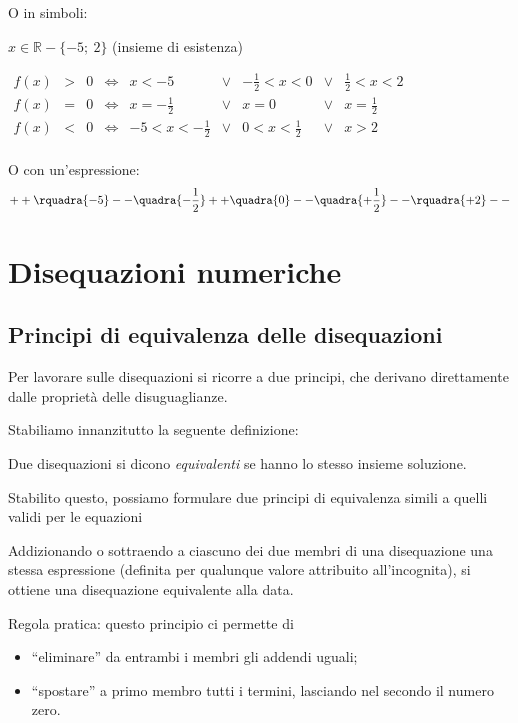 O in simboli:

\(x \in \mathbb{R} - \{ -5;~2 \}\) (insieme di esistenza)

\(\begin{array}{cccccccccc}
f(x) & > & 0 & \Leftrightarrow &
 x < -5 & \lor & -\frac{1}{2} < x < 0 & \lor & \frac{1}{2} < x < 2 \\
f(x) & = & 0 & \Leftrightarrow &
 x = -\frac{1}{2} & \lor & x = 0 & \lor & x = \frac{1}{2} \\
f(x) & < & 0 & \Leftrightarrow &
 -5 < x < -\frac{1}{2} & \lor & 0 < x < \frac{1}{2} & \lor & x > 2 \\
\end{array}\)

\vspace{1em}
O con un'espressione:
\[++\rquadra{-5}--\quadra{-\dfrac{1}{2}}++\quadra{0}
  --\quadra{+\dfrac{1}{2}}--\rquadra{+2}--\]

\section{Disequazioni numeriche}
\label{sec:dis_numeriche}

\subsection{Principi di equivalenza delle disequazioni}

Per lavorare sulle disequazioni si ricorre a due principi, che derivano 
direttamente dalle proprietà delle disuguaglianze.

Stabiliamo innanzitutto la seguente definizione:

\begin{definizione}
Due disequazioni si dicono \emph{equivalenti} se hanno lo
stesso insieme soluzione.
\end{definizione}

Stabilito questo, possiamo formulare due principi di equivalenza
simili a quelli validi per le equazioni

\begin{principio}[I principio]
\label{ppd}
Addizionando o sottraendo a ciascuno dei due membri di
una disequazione una stessa espressione (definita per qualunque
valore attribuito all'incognita), si ottiene una
disequazione equivalente alla data.
\end{principio}

Regola pratica: questo principio ci permette di
\begin{itemize} [nosep]
\item ``eliminare'' da entrambi i membri gli addendi uguali;
\item ``spostare'' a primo membro tutti i termini, lasciando nel secondo il 
numero zero.
\end{itemize}

